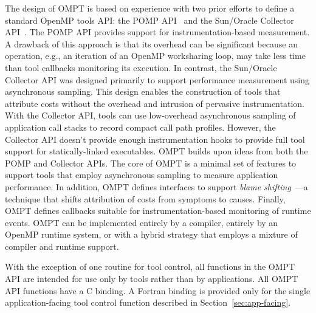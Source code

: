 \documentclass{article}
\begin{document}
The design of OMPT is based on experience with two prior efforts to define a standard OpenMP tools API: the POMP API~\cite{Mohr:EWOMP02} and the Sun/Oracle Collector API~\cite{SunCollector,Jost:2005:AND:1892830.1892858}. 
The POMP API provides support for instrumentation-based measurement. A drawback of this approach  is that its overhead can be significant because an operation, e.g., an iteration of an OpenMP worksharing loop, may take less time than tool callbacks monitoring its execution. 
In contrast, 
the Sun/Oracle Collector API was  designed primarily to support performance measurement 
using asynchronous sampling. This  design enables the construction of tools that attribute costs without the overhead and intrusion of pervasive instrumentation. With the Collector API, tools
 can use low-overhead asynchronous  sampling of application call stacks to record compact call path profiles. However, the Collector API doesn't provide enough instrumentation hooks to provide full tool support for statically-linked executables.
OMPT builds upon ideas from both the POMP and  Collector APIs. The core of OMPT is a minimal set of features to support tools that employ asynchronous sampling to measure application performance. In addition, OMPT defines  interfaces to support  {\em blame shifting}~\cite{Tallent:PPoPP09,Tallent:PPoPP10}---a technique that shifts attribution of costs from symptoms to causes.
Finally, OMPT defines callbacks suitable for instrumentation-based monitoring of runtime events. 
 OMPT can be implemented entirely by a compiler, entirely by an OpenMP runtime system, or with a hybrid strategy that employs a mixture of compiler and runtime support.

With the exception of one routine for tool control, all functions in the OMPT API are intended for use only by tools rather than by applications. All OMPT API functions  have a C binding. A Fortran binding is  provided only for the single application-facing tool control function described in Section~\ref{sec:app-facing}.
\end{document}

